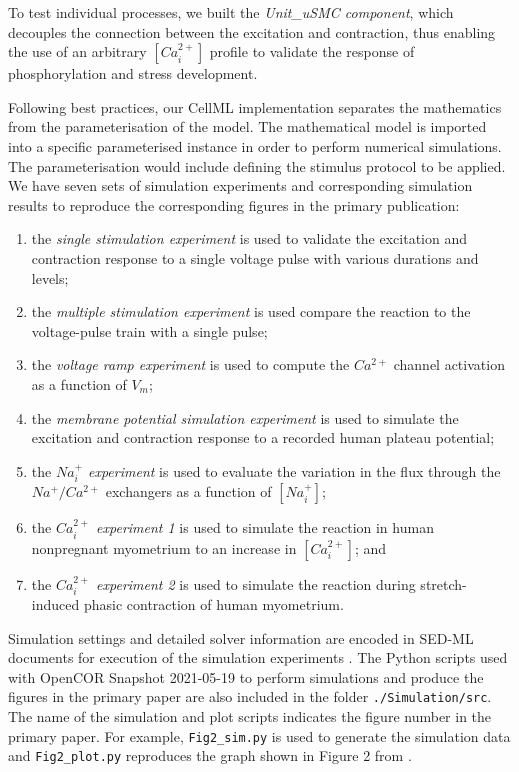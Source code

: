 \documentclass[fleqn,10pt]{physiome}
\begin{document}
To test individual processes, we built the \emph{Unit\_uSMC component}, which decouples the connection between the excitation and contraction, thus enabling the use of an arbitrary $[Ca_{i}^{2+}]$ profile to validate the response of phosphorylation and stress development.  

Following best practices, our CellML implementation separates the mathematics from the parameterisation of the model. The mathematical model is imported into a specific parameterised instance in order to perform numerical simulations. The parameterisation would include defining the stimulus protocol to be applied. We have seven sets of simulation experiments and corresponding simulation results to reproduce the corresponding figures in the primary publication: 
\begin{enumerate}[noitemsep] 
\item the \emph{single stimulation experiment} is used to validate the excitation and contraction response to a single voltage pulse with various durations and levels;
\item the \emph{multiple stimulation experiment} is used compare the reaction to the voltage-pulse train with a single pulse;
\item the \emph{voltage ramp experiment} is used to compute the $Ca^{2+}$ channel activation as a function of $V_m$;
\item the \emph{membrane potential simulation experiment} is used to simulate the excitation and contraction response to a recorded human plateau potential;
\item the \emph{$Na_i^{+}$ experiment} is used to evaluate the variation in the flux through the $Na^{+}/Ca^{2+}$ exchangers as a function of $[Na_i^{+}]$;
\item the \emph{$Ca_{i}^{2+}$ experiment 1} is used to simulate the reaction in human nonpregnant myometrium to an increase in $[Ca_{i}^{2+}]$; and 
\item the \emph{$Ca_{i}^{2+}$ experiment 2} is used to simulate the reaction during stretch-induced phasic contraction of human myometrium.
\end{enumerate}

Simulation settings and detailed solver information are encoded in SED-ML documents for execution of the simulation experiments \citep{waltemath_reproducible_2011}. The Python scripts used with OpenCOR Snapshot 2021-05-19 \citep{garny_opencor_2015} to perform simulations and produce the figures in the primary paper are also included in the folder \texttt{./Simulation/src}. The name of the simulation and plot scripts indicates the figure number in the primary paper. For example, \texttt{Fig2\_sim.py} is used to generate the simulation data and \texttt{Fig2\_plot.py} reproduces the graph shown in Figure 2 from \citet{bursztyn2007mathematical}.
\end{document}

